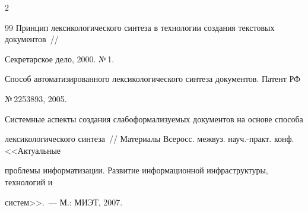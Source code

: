 \begin{multicols}{2}
{{\begin{thebibliography}{99}
Принцип лексикологического синтеза в технологии создания текстовых документов~// 


Секретарское дело, 2000. №\,1.









Способ автоматизированного лексикологического синтеза документов. Патент РФ 


№\,2253893, 2005.









Системные аспекты создания слабоформализуемых документов на основе способа 


лексикологического синтеза~// Материалы Всеросс. межвуз. науч.-практ. конф. <<Актуальные 


проблемы информатизации. Развитие информационной инфраструктуры, технологий и 


систем>>.~--- М.: МИЭТ, 2007.








\label{end\stat}





 \end{thebibliography}


}


}


\end{multicols}


      


       


     


     





     


